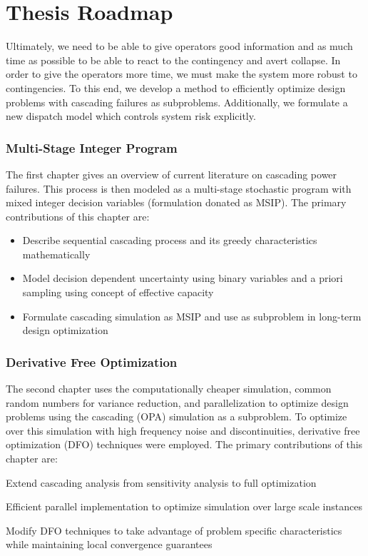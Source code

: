 \section{Thesis Roadmap}
Ultimately, we need to be able to give operators good information and as much time as possible to be able to react to the contingency and avert collapse.  In order to give the operators more time, we must make the system more robust to contingencies.  To this end, we develop a method to efficiently optimize design problems with cascading failures as subproblems.  Additionally, we formulate a new dispatch model which controls system risk explicitly.

\subsubsection{Multi-Stage Integer Program}
The first chapter gives an overview of current literature on cascading power failures.  This process is then modeled as a multi-stage stochastic program with mixed integer decision variables (formulation donated as MSIP).  The primary contributions of this chapter are:
\begin{itemize}
\item Describe sequential cascading process and its greedy characteristics mathematically
\item Model decision dependent uncertainty using binary variables and a priori sampling using concept of effective capacity
\item Formulate cascading simulation as MSIP and use as subproblem in long-term design optimization
\end{itemize}

\subsubsection{Derivative Free Optimization}
The second chapter uses the computationally cheaper simulation, common random numbers for variance reduction, and parallelization to optimize design problems using the cascading (OPA) simulation as a subproblem.  To optimize over this simulation with high frequency noise and discontinuities, derivative free optimization (DFO) techniques were employed.  The primary contributions of this chapter are:
\bi
\item Extend cascading analysis from sensitivity analysis to full optimization
\item Efficient parallel implementation to optimize simulation over large scale instances
\item Modify DFO techniques to take advantage of problem specific characteristics while maintaining local convergence guarantees
\ei

